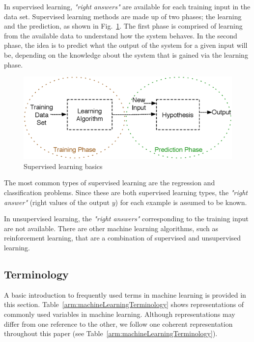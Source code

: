 In supervised learning, \textit{"right answers"} are available for each training input in the data set.
Supervised learning methods are made up of two phases; the learning and the prediction, as shown in Fig.~\ref{fig:supervisedLearningBasics}.
The first phase is comprised of learning from the available data to understand how the system behaves. 
In the second phase, the idea is to predict what the output of the system for a given input will be, depending on the knowledge about the system that is gained via the learning phase. 

\begin{figure}
\begin{center}
\includegraphics[width=14cm]{figures/supervisedLearningBasics}    %
\caption{Supervised learning basics } 
\label{fig:supervisedLearningBasics}
\end{center}
\end{figure}
 
The most common types of supervised learning are the regression and classification problems. 
Since these are both supervised learning types, the \textit{"right answer"} (right values of the output $y$) for each example is assumed to be known. 

In unsupervised learning, the \textit{"right answers"} corresponding to the training input are not available. 
There are other machine learning algorithms, such as reinforcement learning, that are a combination of supervised and unsupervised learning. 

\subsection{Terminology}

A basic introduction to frequently used terms in machine learning is provided in this section.  
Table~\ref{arm:machineLearningTerminology} shows representations of commonly used variables in machine learning. 
Although representations may differ from one reference to the other, we follow one coherent representation throughout this paper (see Table~\ref{arm:machineLearningTerminology}). 

